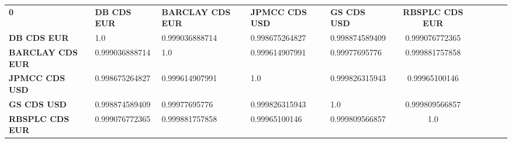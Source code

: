 \begin{center}
 \begin{tabular}{|l|l|l|l|l|c|c|c|c|c|}
\hline
\textbf{0} & \textbf{DB CDS EUR} & \textbf{BARCLAY CDS EUR} & \textbf{JPMCC CDS USD} & \textbf{GS CDS USD} & \textbf{RBSPLC CDS EUR}\\\hhline{|=|=|=|=|=|=|}
\textbf{DB CDS EUR} & 1.0 & 0.999036888714 & 0.998675264827 & 0.998874589409 & 0.999076772365\\
\textbf{BARCLAY CDS EUR} & 0.999036888714 & 1.0 & 0.999614907991 & 0.99977695776 & 0.999881757858\\
\textbf{JPMCC CDS USD} & 0.998675264827 & 0.999614907991 & 1.0 & 0.999826315943 & 0.99965100146\\
\textbf{GS CDS USD} & 0.998874589409 & 0.99977695776 & 0.999826315943 & 1.0 & 0.999809566857\\
\textbf{RBSPLC CDS EUR} & 0.999076772365 & 0.999881757858 & 0.99965100146 & 0.999809566857 & 1.0\\
\hline
\end{tabular}
\end{center}